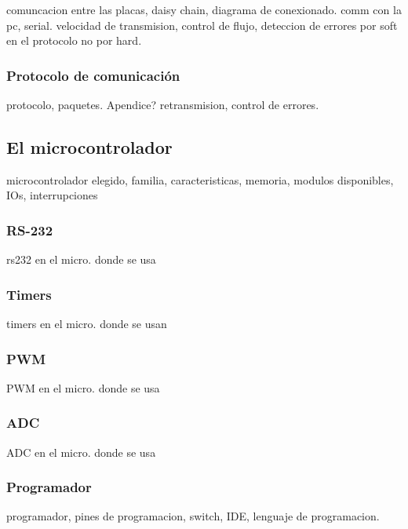 comuncacion entre las placas, daisy chain, diagrama de conexionado.
comm con la pc, serial.
velocidad de transmision, control de flujo, deteccion de errores por soft en el protocolo no por hard.

\subsubsection{Protocolo de comunicaci\'on}
\label{HCprotocolo}

protocolo, paquetes. Apendice?
retransmision, control de errores.

\subsection{El microcontrolador}
\label{Hmicro}

microcontrolador elegido, familia, caracteristicas, memoria, modulos disponibles, IOs, interrupciones

\subsubsection{RS-232}
\label{HMrs232}

rs232 en el micro. donde se usa

\subsubsection{Timers}
\label{HMtimers}

timers en el micro. donde se usan

\subsubsection{PWM}
\label{HMpwm}

PWM en el micro. donde se usa

\subsubsection{ADC}
\label{HMadc}

ADC en el micro. donde se usa

\subsubsection{Programador}
\label{HMprogramador}

programador, pines de programacion, switch, IDE, lenguaje de programacion.

